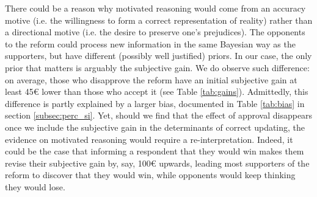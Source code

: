 \documentclass[11pt]{article}
\begin{document}
\begin{appendices}

There could be a reason why motivated reasoning would come from an accuracy motive (i.e. the willingness to form a correct representation of reality) rather than a directional motive (i.e. the desire to preserve one's prejudices). The opponents to the reform could process new information in the same Bayesian way as the supporters, but have different (possibly well justified) priors. In our case, the only prior that matters is arguably the subjective gain. We do observe such difference: on average, those who disapprove the reform have an initial subjective gain at least 45\euro{} lower than those who accept it (see Table \ref{tab:gains}). Admittedly, this difference is partly explained by a larger bias, documented in Table \ref{tab:bias} in section \ref{subsec:perc_si}. Yet, should we find that the effect of approval disappears once we include the subjective gain in the determinants of correct updating, the evidence on motivated reasoning would require a re-interpretation. Indeed, it could be the case that informing a respondent that they would win makes them revise their subjective gain by, say, 100\euro{} upwards, leading most supporters of the reform to discover that they would win, while opponents would keep thinking they would lose. %



\end{appendices}
\end{document}
